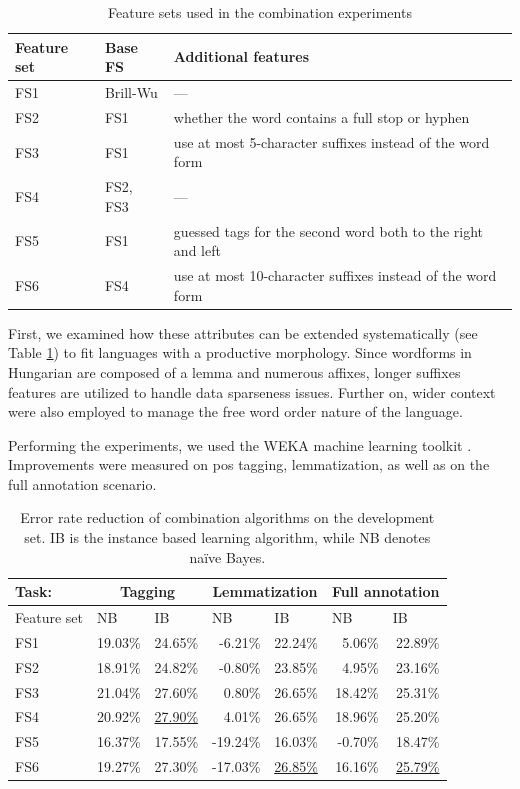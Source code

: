 \begin{table}[H]
\centering
\caption{Feature sets used in the combination experiments}\label{tab:comb-feature-sets}
\begin{tabular}{l l l}
\hline
Feature set & Base FS & Additional features \\
\hline
FS1 & Brill-Wu & --- \\
FS2 & FS1 & whether the word contains a full stop or hyphen \\
FS3 & FS1 & use at most 5-character suffixes instead of the word form \\
FS4 & FS2, FS3 & --- \\ 
FS5 & FS1 & guessed tags for the second word both to the right and left \\
FS6 & FS4 & use at most 10-character suffixes instead of the word form \\
\hline
\end{tabular}
\end{table}

First, we examined how these attributes can be extended systematically (see Table \ref{tab:comb-feature-sets}) to fit languages with a productive morphology.
Since wordforms in Hungarian are composed of a lemma and numerous affixes, longer suffixes features are utilized to handle data sparseness issues.
Further on, wider context were also employed to manage the free word order nature of the language. 


Performing the experiments, we used the WEKA machine learning toolkit \cite{Hall2009}.
Improvements were measured on \acrshort{pos} tagging, lemmatization, as well as on the full annotation scenario.

\begin{table}[H]
\centering
\caption{Error rate reduction of combination algorithms on the development set. IB is the instance based learning algorithm, while NB denotes naïve Bayes.}\label{tab:comb-reduction-rates}
\begin{tabular}{l r r r r r r}
\hline
Task:& \multicolumn{2}{c}{Tagging} & \multicolumn{2}{c}{Lemmatization} & \multicolumn{2}{c}{Full annotation} \\
\hline
Feature set & \multicolumn{1}{l}{NB} & \multicolumn{1}{l}{IB} & \multicolumn{1}{l}{NB} & \multicolumn{1}{l}{IB} & \multicolumn{1}{l}{NB} & \multicolumn{1}{l}{IB} \\
\hline
FS1 & 19.03\% & 24.65\% & -6.21\% & 22.24\% & 5.06\% & 22.89\% \\
FS2 & 18.91\% & 24.82\% & -0.80\% & 23.85\% & 4.95\% & 23.16\% \\
FS3 & 21.04\% & 27.60\% & 0.80\% & 26.65\% & 18.42\% & 25.31\% \\
FS4 & 20.92\% & \underline{27.90\%} & 4.01\% & 26.65\% & 18.96\% & 25.20\% \\
FS5 & 16.37\% & 17.55\% & -19.24\% & 16.03\% & -0.70\% & 18.47\% \\
FS6 & 19.27\% & 27.30\% & -17.03\% & \underline{26.85\%} & 16.16\% & \underline{25.79\%} \\
\hline
\end{tabular}
\end{table}


